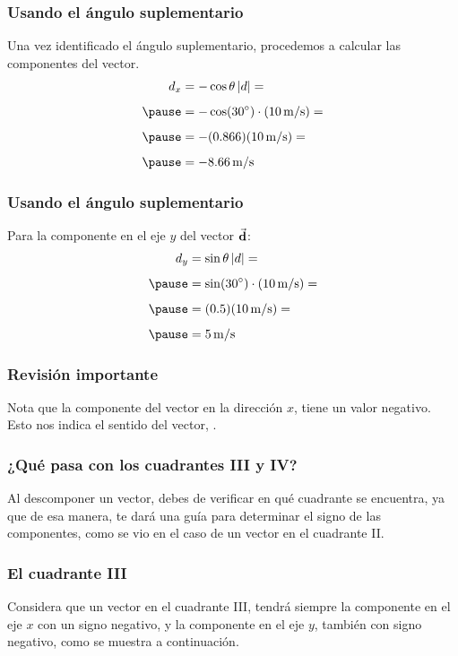 \documentclass[14pt]{beamer}
\begin{document}
\begin{frame}
\frametitle{Usando el ángulo suplementario}
Una vez identificado el ángulo suplementario, procedemos a calcular las componentes del vector.
\pause
\begin{eqnarray*}
\begin{aligned}
d_{x} &= - \cos \theta \, \abs{d} =  \\[0.5em] \pause
&= - \cos (\ang{30}) \cdot (\SI[per-mode=symbol]{10}{\meter\per\second}) =  \\[0.5em] \pause
&= - (0.866) (\SI[per-mode=symbol]{10}{\meter\per\second}) =  \\[0.5em] \pause
&= - \SI[per-mode=symbol]{8.66}{\meter\per\second}
\end{aligned}
\end{eqnarray*}
\end{frame}
\begin{frame}
\frametitle{Usando el ángulo suplementario}
Para la componente en el eje $y$ del vector $\va{d}$:
\pause
\begin{eqnarray*}
\begin{aligned}
d_{y} &= \sin \theta \, \abs{d} =  \\[0.5em] \pause
&= \sin (\ang{30}) \cdot (\SI[per-mode=symbol]{10}{\meter\per\second}) =  \\[0.5em] \pause
&= (0.5) (\SI[per-mode=symbol]{10}{\meter\per\second}) =  \\[0.5em] \pause
&= \SI[per-mode=symbol]{5}{\meter\per\second}
\end{aligned}
\end{eqnarray*}
\end{frame}
\begin{frame}
\frametitle{Revisión importante}
Nota que la componente del vector en la dirección $x$, tiene un valor negativo.
\\
\bigskip
Esto nos indica el sentido del vector, .
\end{frame}
\begin{frame}
\frametitle{¿Qué pasa con los cuadrantes III y IV?}
Al descomponer un vector, debes de verificar en qué cuadrante se encuentra, \pause ya que de esa manera, te dará una guía para determinar el signo de las componentes, como se vio en el caso de un vector en el cuadrante II.
\end{frame}
\begin{frame}
\frametitle{El cuadrante III}
Considera que un vector en el cuadrante III, tendrá siempre la componente en el eje $x$ con un signo negativo, \pause y la componente en el eje $y$, también con signo negativo, como se muestra a continuación.
\end{frame}
\end{document}
